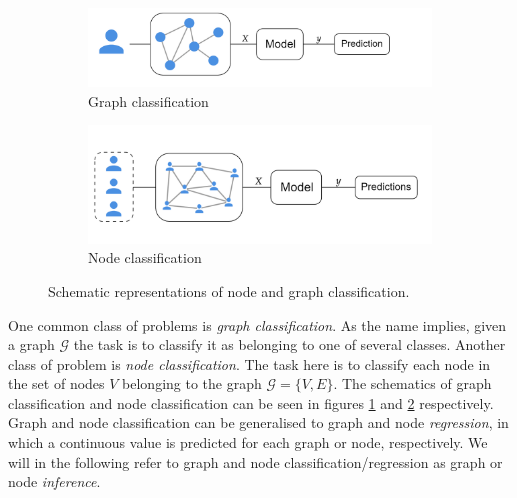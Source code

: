 \begin{figure}[H]
    \centering
        \begin{subfigure}{.5\textwidth}
            \centering
            \includegraphics[width=.9\linewidth]{chapters/images_theory/graph_classification.png}
            \caption{Graph classification}
            \label{fig:graph_classification}
        \end{subfigure}%
        \begin{subfigure}{.5\textwidth}
            \centering
            \includegraphics[width=.9\linewidth]{chapters/images_theory/node_classification.png}
            \caption{Node classification}
            \label{fig:node_classification}
        \end{subfigure}
    \caption{Schematic representations of node and graph classification. }
    \label{fig:graph_and_node_class}
\end{figure}

One common class of problems is \textit{graph classification}. As the name implies, given a graph $\mathcal{G}$ the task is to classify it as belonging to one of several classes. Another class of problem is \textit{node classification}. The task here is to classify each node in the set of nodes $V$ belonging to the graph $\mathcal{G} = \{V, E \}$. The schematics of graph classification and node classification can be seen in figures \ref{fig:graph_classification} and \ref{fig:node_classification} respectively. Graph and node classification can be generalised to graph and node \textit{regression}, in which a continuous value is predicted for each graph or node, respectively. We will in the following refer to graph and node classification/regression as graph or node \textit{inference}.

